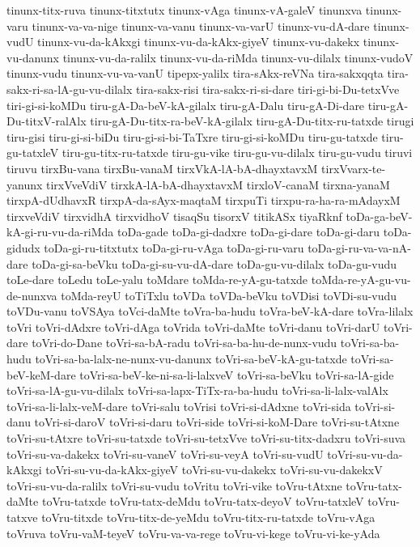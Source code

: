 {tinunx-titx-ruva
tinunx-titxtutx
tinunx-vAga
tinunx-vA-galeV
tinunxva
tinunx-varu
tinunx-va-va-nige
tinunx-va-vanu
tinunx-va-varU
tinunx-vu-dA-dare
tinunx-vudU
tinunx-vu-da-kAkxgi
tinunx-vu-da-kAkx-giyeV
tinunx-vu-dakekx
tinunx-vu-danunx
tinunx-vu-da-ralilx
tinunx-vu-da-riMda
tinunx-vu-dilalx
tinunx-vudoV
tinunx-vudu
tinunx-vu-va-vanU
tipepx-yalilx
tira-sAkx-reVNa
tira-sakxqqta
tira-sakx-ri-sa-lA-gu-vu-dilalx
tira-sakx-risi
tira-sakx-ri-si-dare
tiri-gi-bi-Du-tetxVve
tiri-gi-si-koMDu
tiru-gA-Da-beV-kA-gilalx
tiru-gA-Dalu
tiru-gA-Di-dare
tiru-gA-Du-titxV-ralAlx
tiru-gA-Du-titx-ra-beV-kA-gilalx
tiru-gA-Du-titx-ru-tatxde
tirugi
tiru-gisi
tiru-gi-si-biDu
tiru-gi-si-bi-TaTxre
tiru-gi-si-koMDu
tiru-gu-tatxde
tiru-gu-tatxleV
tiru-gu-titx-ru-tatxde
tiru-gu-vike
tiru-gu-vu-dilalx
tiru-gu-vudu
tiruvi
tiruvu
tirxBu-vana
tirxBu-vanaM
tirxVkA-lA-bA-dhayxtavxM
tirxVvarx-te-yanunx
tirxVveVdiV
tirxkA-lA-bA-dhayxtavxM
tirxloV-canaM
tirxna-yanaM
tirxpA-dUdhavxR
tirxpA-da-sAyx-maqtaM
tirxpuTi
tirxpu-ra-ha-ra-mAdayxM
tirxveVdiV
tirxvidhA
tirxvidhoV
tisaqSu
tisorxV
titikASx
tiyaRknf
toDa-ga-beV-kA-gi-ru-vu-da-riMda
toDa-gade
toDa-gi-dadxre
toDa-gi-dare
toDa-gi-daru
toDa-gidudx
toDa-gi-ru-titxtutx
toDa-gi-ru-vAga
toDa-gi-ru-varu
toDa-gi-ru-va-va-nA-dare
toDa-gi-sa-beVku
toDa-gi-su-vu-dA-dare
toDa-gu-vu-dilalx
toDa-gu-vudu
toLe-dare
toLedu
toLe-yalu
toMdare
toMda-re-yA-gu-tatxde
toMda-re-yA-gu-vu-de-nunxva
toMda-reyU
toTiTxlu
toVDa
toVDa-beVku
toVDisi
toVDi-su-vudu
toVDu-vanu
toVSAya
toVci-daMte
toVra-ba-hudu
toVra-beV-kA-dare
toVra-lilalx
toVri
toVri-dAdxre
toVri-dAga
toVrida
toVri-daMte
toVri-danu
toVri-darU
toVri-dare
toVri-do-Dane
toVri-sa-bA-radu
toVri-sa-ba-hu-de-nunx-vudu
toVri-sa-ba-hudu
toVri-sa-ba-lalx-ne-nunx-vu-danunx
toVri-sa-beV-kA-gu-tatxde
toVri-sa-beV-keM-dare
toVri-sa-beV-ke-ni-sa-li-lalxveV
toVri-sa-beVku
toVri-sa-lA-gide
toVri-sa-lA-gu-vu-dilalx
toVri-sa-lapx-TiTx-ra-ba-hudu
toVri-sa-li-lalx-valAlx
toVri-sa-li-lalx-veM-dare
toVri-salu
toVrisi
toVri-si-dAdxne
toVri-sida
toVri-si-danu
toVri-si-daroV
toVri-si-daru
toVri-side
toVri-si-koM-Dare
toVri-su-tAtxne
toVri-su-tAtxre
toVri-su-tatxde
toVri-su-tetxVve
toVri-su-titx-dadxru
toVri-suva
toVri-su-va-dakekx
toVri-su-vaneV
toVri-su-veyA
toVri-su-vudU
toVri-su-vu-da-kAkxgi
toVri-su-vu-da-kAkx-giyeV
toVri-su-vu-dakekx
toVri-su-vu-dakekxV
toVri-su-vu-da-ralilx
toVri-su-vudu
toVritu
toVri-vike
toVru-tAtxne
toVru-tatx-daMte
toVru-tatxde
toVru-tatx-deMdu
toVru-tatx-deyoV
toVru-tatxleV
toVru-tatxve
toVru-titxde
toVru-titx-de-yeMdu
toVru-titx-ru-tatxde
toVru-vAga
toVruva
toVru-vaM-teyeV
toVru-va-va-rege
toVru-vi-kege
toVru-vi-ke-yAda
}
